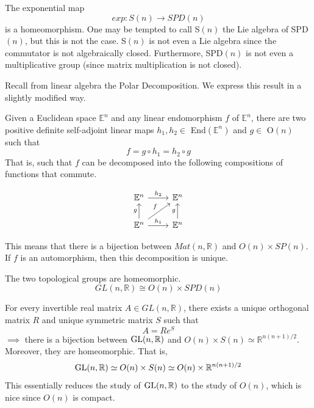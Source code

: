   \begin{lemma}
    The exponential map 
    \begin{equation}
      exp: S(n) \longrightarrow SPD(n)
    \end{equation}
    is a homeomorphism. One may be tempted to call S$(n)$ the Lie algebra of SPD$(n)$, but this is not the case. S$(n)$ is not even a Lie algebra since the commutator is not algebraically closed. Furthermore, SPD$(n)$ is not even a multiplicative group (since matrix multiplication is not closed). 
  \end{lemma}

  Recall from linear algebra the Polar Decomposition. We express this result in a slightly modified way. 

  \begin{theorem}
    Given a Euclidean space $\mathbb{E}^n$ and any linear endomorphism $f$ of $\mathbb{E}^n$, there are two positive definite self-adjoint linear maps $h_1, h_2 \in$ End$(\mathbb{E}^n)$ and $g \in$ O$(n)$ such that
    \begin{equation}
      f = g \circ h_1 = h_2 \circ g
    \end{equation}
    That is, such that $f$ can be decomposed into the following compositions of functions that commute. 

    \[\begin{tikzcd}
    \mathbb{E}^n \arrow{r}{h_2} & \mathbb{E}^n \\
    \mathbb{E}^n \arrow{u}{g} \arrow{ur}{f} \arrow{r}{h_1} & \mathbb{E}^n \arrow{u}{g}
    \end{tikzcd}\]

    This means that there is a bijection between $Mat(n, \mathbb{R})$ and $O(n) \times SP(n)$. If $f$ is an automorphism, then this decomposition is unique. 
  \end{theorem}

  \begin{corollary}
    The two topological groups are homeomorphic. 
    \begin{equation}
      GL(n, \mathbb{R}) \cong O(n) \times SPD(n)
    \end{equation}
  \end{corollary}

  \begin{corollary}
    For every invertible real matrix $A \in GL(n, \mathbb{R})$, there exists a unique orthogonal matrix $R$ and unique symmetric matrix $S$ such that
    \begin{equation}
      A = R e^S
    \end{equation}
    $\implies$ there is a bijection between $\operatorname{GL}(n, \mathbb{R})$ and $O(n) \times S(n) \simeq \mathbb{R}^{n(n+1)/2}$. Moreover, they are homeomorphic. That is, 
    \begin{equation}
      \operatorname{GL}(n, \mathbb{R}) \simeq O(n) \times S(n) \simeq O(n) \times \mathbb{R}^{n(n+1)/2}
    \end{equation}
    This essentially reduces the study of $\operatorname{GL}(n, \mathbb{R})$ to the study of $O(n)$, which is nice since $O(n)$ is compact. 
  \end{corollary}

